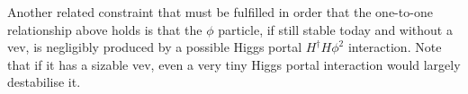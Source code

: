 \documentclass[prd,a4paper,twocolumn,preprintnumbers,nofootinbib,superscriptaddress]{revtex4}
\begin{document}
	
	
Another related constraint that must be fulfilled in order that the one-to-one relationship above holds is that the $\phi$ particle, if still stable today and without a vev, is negligibly produced by a possible Higgs portal $H^\dagger H \phi^2$ interaction. Note that if it has a sizable vev, even a very tiny Higgs portal interaction would largely destabilise it. 
	
\end{document}
